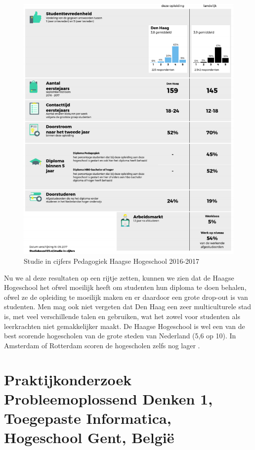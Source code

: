 \begin{figure}
	\includegraphics[width=\textwidth]
	{img/pedagogiek.png}
	\caption{Studie in cijfers Pedagogiek Haagse Hogeschool 2016-2017}
	\label{fig:pedagogiek}
\end{figure}

Nu we al deze resultaten op een rijtje zetten, kunnen we zien dat de Haagse Hogeschool het ofwel moeilijk heeft om studenten hun diploma te doen behalen, ofwel ze de opleiding te moeilijk maken en er daardoor een grote drop-out is van studenten. Men mag ook niet vergeten dat Den Haag een zeer multiculturele stad is, met veel verschillende talen en gebruiken, wat het zowel voor studenten als leerkrachten niet gemakkelijker maakt. De Haagse Hogeschool is wel een van de best scorende hogescholen van de grote steden van Nederland (5,6 op 10). In Amsterdam of Rotterdam scoren de hogescholen zelfs nog lager \autocite{AD-PeterKoop2017}.

\newpage
\section{Praktijkonderzoek Probleemoplossend Denken 1, Toegepaste Informatica, Hogeschool Gent, België}
\label{sec:pod1gent}

